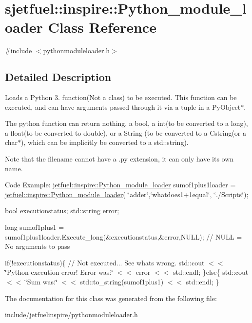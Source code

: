 \hypertarget{classsjetfuel_1_1inspire_1_1Python__module__loader}{}\section{sjetfuel\+:\+:inspire\+:\+:Python\+\_\+module\+\_\+loader Class Reference}
\label{classsjetfuel_1_1inspire_1_1Python__module__loader}


{\ttfamily \#include $<$pythonmoduleloader.\+h$>$}



\subsection{Detailed Description}
Loads a Python 3. function(\+Not a class) to be executed. This function can be executed, and can have arguments passed through it via a tuple in a Py\+Object$\ast$.

The python function can return nothing, a bool, a int(to be converted to a long), a float(to be converted to double), or a String (to be converted to a Cstring(or a char$\ast$), which can be implicitly be converted to a std\+::string).

Note that the filename cannot have a .py extension, it can only have it\textquotesingle{}s own name.

Code Example\+: \hyperlink{classjetfuel_1_1inspire_1_1Python__module__loader}{jetfuel\+::inspire\+::\+Python\+\_\+module\+\_\+loader} sumof1plus1loader = \hyperlink{classjetfuel_1_1inspire_1_1Python__module__loader}{jetfuel\+::inspire\+::\+Python\+\_\+module\+\_\+loader}( \char`\"{}adder\char`\"{},\char`\"{}whatdoes1+1equal\char`\"{}, \char`\"{}./\+Scripts\char`\"{});

bool executionstatus; std\+::string error;

long sumof1plus1 = sumof1plus1loader.\+Execute\+\_\+long(\&executionstatus,\&error,\+N\+U\+L\+L); // N\+U\+LL = No arguments to pass

if(!executionstatus)\{ // Not executed... See what\textquotesingle{}s wrong. std\+::cout $<$$<$ \char`\"{}\+Python execution error! Error was\+:\char`\"{} $<$$<$ error $<$$<$ std\+::endl; \}else\{ std\+::cout $<$$<$ \char`\"{}\+Sum was\+:\char`\"{} $<$$<$ std\+::to\+\_\+string(sumof1plus1) $<$$<$ std\+::endl; \} 

The documentation for this class was generated from the following file\+:\begin{DoxyCompactItemize}
\item 
include/jetfuelinspire/pythonmoduleloader.\+h\end{DoxyCompactItemize}
